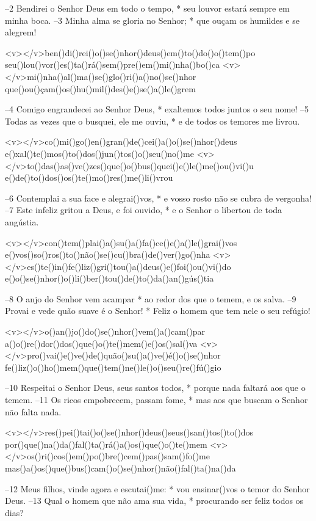 –2 Bendirei o Senhor Deus em todo o tempo, *
seu louvor estará sempre em minha boca.
–3 Minha alma se gloria no Senhor; *
que ouçam os humildes e se alegrem!

<v></v>ben()di()rei()o()se()nhor()deus()em()to()do()o()tem()po
seu()lou()vor()es()ta()rá()sem()pre()em()mi()nha()bo()ca
<v></v>mi()nha()al()ma()se()glo()ri()a()no()se()nhor
que()ou()çam()os()hu()mil()des()e()se()a()le()grem

–4 Comigo engrandecei ao Senhor Deus, *
exaltemos todos juntos o seu nome!
–5 Todas as vezes que o busquei, ele me ouviu, *
e de todos os temores me livrou.

<v></v>co()mi()go()en()gran()de()cei()a()o()se()nhor()deus
e()xal()te()mos()to()dos()jun()tos()o()seu()no()me
<v></v>to()das()as()ve()zes()que()o()bus()quei()e()le()me()ou()vi()u
e()de()to()dos()os()te()mo()res()me()li()vrou

–6 Contemplai a sua face e alegrai()vos, *
e vosso rosto não se cubra de vergonha!
–7 Este infeliz gritou a Deus, e foi ouvido, *
e o Senhor o libertou de toda angústia.

<v></v>con()tem()plai()a()su()a()fa()ce()e()a()le()grai()vos
e()vos()so()ros()to()não()se()cu()bra()de()ver()go()nha
<v></v>es()te()in()fe()liz()gri()tou()a()deus()e()foi()ou()vi()do
e()o()se()nhor()o()li()ber()tou()de()to()da()an()gús()tia

–8 O anjo do Senhor vem acampar *
ao redor dos que o temem, e os salva.
–9 Provai e vede quão suave é o Senhor! *
Feliz o homem que tem nele o seu refúgio!

<v></v>o()an()jo()do()se()nhor()vem()a()cam()par
a()o()re()dor()dos()que()o()te()mem()e()os()sal()va
<v></v>pro()vai()e()ve()de()quão()su()a()ve()é()o()se()nhor
fe()liz()o()ho()mem()que()tem()ne()le()o()seu()re()fú()gio

–10 Respeitai o Senhor Deus, seus santos todos, *
porque nada faltará aos que o temem.
–11 Os ricos empobrecem, passam fome, *
mas aos que buscam o Senhor não falta nada.

<v></v>res()pei()tai()o()se()nhor()deus()seus()san()tos()to()dos
por()que()na()da()fal()ta()rá()a()os()que()o()te()mem
<v></v>os()ri()cos()em()po()bre()cem()pas()sam()fo()me
mas()a()os()que()bus()cam()o()se()nhor()não()fal()ta()na()da

–12 Meus filhos, vinde agora e escutai()me: *
vou ensinar()vos o temor do Senhor Deus.
–13 Qual o homem que não ama sua vida, *
procurando ser feliz todos os dias?

